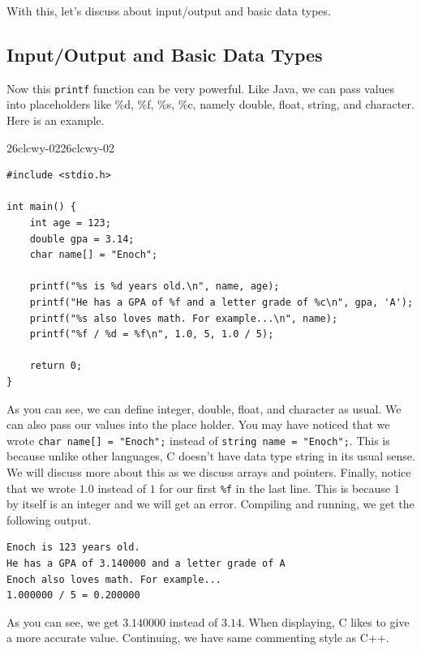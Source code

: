 \documentclass[../../../main.tex]{subfiles}
\begin{document}
With this, let's discuss about input/output and basic data types.

\subsection{Input/Output and Basic Data Types}

Now this \verb|printf| function can be very powerful. Like Java,
we can pass values into placeholders like \%d, \%f, \%s, \%c,
namely double, float, string, and character. Here is an example.

\begin{cbox}{26clcwy-02}{26clcwy-02}
\begin{lstlisting}[style=cstyle]
#include <stdio.h>

int main() {
    int age = 123;
    double gpa = 3.14;
    char name[] = "Enoch";

    printf("%s is %d years old.\n", name, age);
    printf("He has a GPA of %f and a letter grade of %c\n", gpa, 'A');
    printf("%s also loves math. For example...\n", name);
    printf("%f / %d = %f\n", 1.0, 5, 1.0 / 5);

    return 0;
}
\end{lstlisting}
\end{cbox}

As you can see, we can define integer, double, float, and character
as usual. We can also pass our values into the place holder.
You may have noticed that we wrote \verb|char name[] = "Enoch";|
instead of \verb|string name = "Enoch";|. This is because unlike
other languages, C doesn't have data type string in its usual sense.
We will discuss more about this as we discuss arrays and pointers.
Finally, notice that we wrote $1.0$ instead of $1$ for our first
\verb|%f| in the last line. This is because $1$ by itself is an
integer and we will get an error. Compiling and running, we get the
following output.

\begin{outputbox}
\begin{lstlisting}[style=basic]
Enoch is 123 years old.
He has a GPA of 3.140000 and a letter grade of A
Enoch also loves math. For example...
1.000000 / 5 = 0.200000
\end{lstlisting}
\end{outputbox}

As you can see, we get $3.140000$ instead of $3.14$. When displaying,
C likes to give a more accurate value. Continuing, we have same
commenting style as C++.
\end{document}
